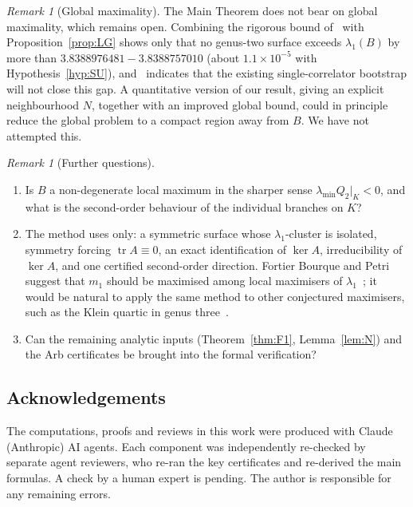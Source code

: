 \documentclass[11pt]{amsart}
\theoremstyle{definition}
\theoremstyle{remark}
\newtheorem{remark}[theorem]{Remark}
\newcommand{\tr}{\operatorname{tr}}
\begin{document}
\begin{remark}[Global maximality]
The Main Theorem does not bear on global maximality, which remains open. Combining the rigorous
bound of~\cite{KMP} with Proposition~\ref{prop:LG} shows only that no genus-two surface exceeds
$\lambda_1(B)$ by more than $3.8388976481-3.8388757010$ (about $1.1\times10^{-5}$ with
Hypothesis~\ref{hyp:SU}), and~\cite{Rad} indicates that the existing
single-correlator bootstrap will not close this gap. A quantitative version of our result, giving an
explicit neighbourhood $N$, together with an improved global bound, could in principle reduce the
global problem to a compact region away from $B$. We have not attempted this.
\end{remark}

\begin{remark}[Further questions]
\begin{enumerate}
\item Is $B$ a non-degenerate local maximum in the sharper sense $\lambda_{\min}Q_2|_K<0$, and what is
the second-order behaviour of the individual branches on $K$?
\item The method uses only: a symmetric surface whose $\lambda_1$-cluster is isolated, symmetry forcing
$\tr A\equiv0$, an exact identification of $\ker A$, irreducibility of $\ker A$, and one certified
second-order direction. Fortier Bourque and Petri suggest that $m_1$ should be maximised among local
maximisers of $\lambda_1$~\cite[\S9]{FBP-LP}; it would be natural to apply the same method to other
conjectured maximisers, such as the Klein quartic in genus three~\cite{FBP-K,FBP-LP}.
\item Can the remaining analytic inputs (Theorem~\ref{thm:F1}, Lemma~\ref{lem:N}) and the Arb
certificates be brought into the formal verification?
\end{enumerate}
\end{remark}

\subsection*{Acknowledgements}
The computations, proofs and reviews in this work were produced with Claude (Anthropic) AI agents.
Each component was independently re-checked by separate agent reviewers, who re-ran the key
certificates and re-derived the main formulas. A check by a human expert is pending. The author is
responsible for any remaining errors.

\appendix
\end{document}
